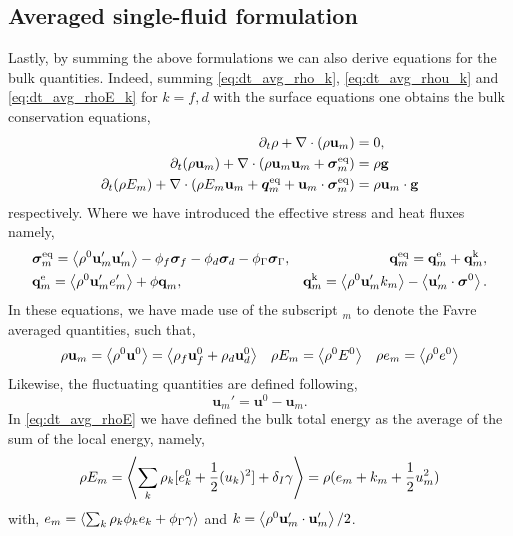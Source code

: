 \subsection{Averaged single-fluid formulation}
Lastly, by summing the above formulations we can also derive equations for the bulk quantities. 
Indeed, summing \ref{eq:dt_avg_rho_k}, \ref{eq:dt_avg_rhou_k} and \ref{eq:dt_avg_rhoE_k} for $k=f,d$ with the surface equations one obtains the bulk conservation equations, 
\begin{align}
    \label{eq:dt_avg_rho}
    \pddt \rho 
    + \div (
         \rho \textbf{u}_m
    )
    &= 
    0,\\
    \label{eq:dt_avg_rhou_m}
    \pddt ( \rho\textbf{u}_m)  
    + \div (
         \rho\textbf{u}_m\textbf{u}_m
        + \bm{\sigma}^\text{eq}_m
    )
    &= 
     \rho \textbf{g} \\
    \label{eq:dt_avg_rhoE}
    \pddt (\rho E_m)  
    + \div (
        \rho E_m \textbf{u}_m
        + \bm{q}^\text{eq}_m
        + \textbf{u}_m \cdot \bm{\sigma}^\text{eq}_m
        )
    &= 
     \rho \textbf{u}_m  \cdot \textbf{g} 
\end{align} 
respectively. 
Where we have introduced the effective stress and heat fluxes namely, 
\begin{align*}
    &\bm{\sigma}^\text{eq}_m
    = 
    \avg{ \rho^0\textbf{u}'_m\textbf{u}'_m}
      - \phi_f\bm\sigma_f
      - \phi_d\bm\sigma_d
      - \phi_\Gamma\bm\sigma_\Gamma,%
    &\textbf{q}^\text{eq}_m
    =\textbf{q}^\text{e}_m +\textbf{q}^\text{k}_m,  \\
    &\textbf{q}^\text{e}_m
    = \avg{\rho^0\textbf{u}_m' e_m'} 
    + \phi\textbf{q}_m,
    &\textbf{q}^\text{k}_m
    = \avg{\rho^0 \textbf{u}_m' k_m} 
    - \avg{ \textbf{u}_m' \cdot \bm{\sigma}^0}.
\end{align*}
In these equations, we have made use of the subscript $_m$ to denote the Favre averaged quantities, such that, 
\begin{align*}
    \rho \textbf{u}_m
    = \left<\rho^0 \textbf{u}^0\right>
    = \left<\rho_f \textbf{u}^0_f
    + \rho_d \textbf{u}_d^0\right>
    &&
    \rho E_m
    = \left<\rho^0 E^0\right>
    &&
    \rho e_m
    = \left<\rho^0 e^0\right>
\end{align*}
Likewise, the fluctuating quantities are defined following, 
\begin{equation}
    \textbf{u}_m'
    = \textbf{u}^0 - \textbf{u}_m.
\end{equation}
In \ref{eq:dt_avg_rhoE} we have defined the bulk total energy as the average of the sum of the local energy, namely, 
\begin{equation}
    \rho E_m = \left<\sum_k \rho_k [e_k^0 + \frac{1}{2}(u_k)^2] 
    + \delta_I \gamma\right>
    = \rho( e_m +  k_m + \frac{1}{2}u_m^2)
\end{equation}
with, $e_m = \left<\sum_k \rho_k\phi_k e_k + \phi_\Gamma \gamma\right>$ and $k = \left<\rho^0 \textbf{u}_m'\cdot \textbf{u}_m'\right>/2$. 

